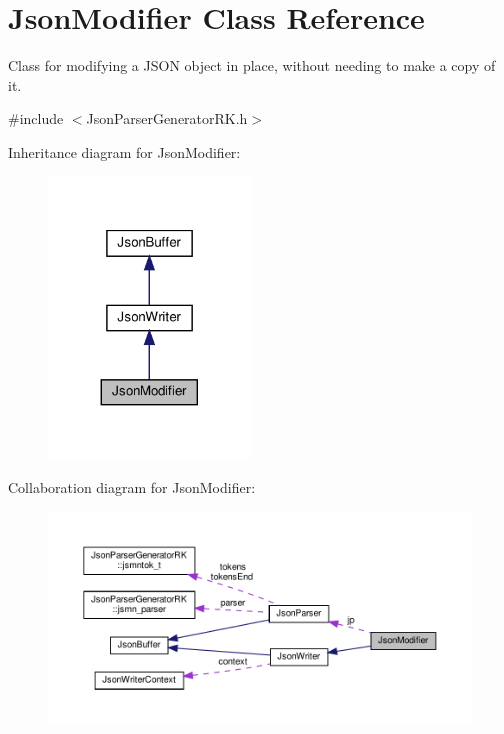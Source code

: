 \hypertarget{class_json_modifier}{}\section{Json\+Modifier Class Reference}
\label{class_json_modifier}


Class for modifying a J\+S\+ON object in place, without needing to make a copy of it.  




{\ttfamily \#include $<$Json\+Parser\+Generator\+R\+K.\+h$>$}



Inheritance diagram for Json\+Modifier\+:\nopagebreak
\begin{figure}[H]
\begin{center}
\leavevmode
\includegraphics[width=152pt]{class_json_modifier__inherit__graph}
\end{center}
\end{figure}


Collaboration diagram for Json\+Modifier\+:\nopagebreak
\begin{figure}[H]
\begin{center}
\leavevmode
\includegraphics[width=350pt]{class_json_modifier__coll__graph}
\end{center}
\end{figure}
